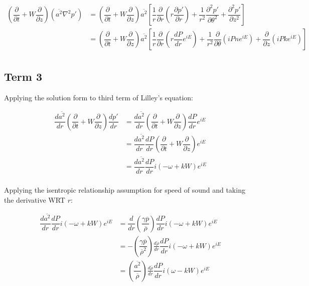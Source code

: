 \documentclass[]{aiaa-tc}%
\begin{document}
\begin{equation}
\begin{split}
\left( \dfrac{\partial}{\partial t} + W \dfrac{\partial}{\partial z} \right) (\overline{a^2}\nabla^2p')
&= \left( \dfrac{\partial}{\partial t} + W \dfrac{\partial}{\partial z}
   \right) \overline{a^2}
   \left[\dfrac{1}{r}\dfrac{\partial}{\partial r} \left( r\dfrac{\partial p'}{\partial r} \right)
      + \dfrac{1}{r^2} \dfrac{\partial^2 p'}{\partial \theta^2}
      + \dfrac{\partial^2 p'}{\partial z^2} \right] \\
&= \left( \dfrac{\partial}{\partial t} + W \dfrac{\partial}{\partial z}
   \right) \overline{a^2}
   \left[\dfrac{1}{r}\dfrac{\partial}{\partial r} \left( r \dfrac{dP}{dr} e^{iE} \right)
      + \dfrac{1}{r^2} \dfrac{\partial }{\partial \theta} \left( iPn e^{iE} \right)
      + \dfrac{\partial}{\partial z} \left( iPk e^{iE} \right) \right] \\
\end{split}
\end{equation}






\clearpage
\subsection{Term 3}

Applying the solution form to third term of Lilley's equation:

\begin{align*}
\dfrac{d \overline{a^2}}{dr} \left( \dfrac{\partial}{\partial t} + W \dfrac{\partial}{\partial z} \right) \dfrac{dp'}{dr}
&= \dfrac{d \overline{a^2}}{dr}
   \left( \dfrac{\partial}{\partial t} + W \dfrac{\partial}{\partial z} \right)
   \dfrac{dP}{dr} e^{iE}  \\
&= \dfrac{d \overline{a^2}}{dr} \dfrac{dP}{dr}
   \left( \dfrac{\partial}{\partial t} + W \dfrac{\partial}{\partial z} \right) e^{iE} \\
&= \dfrac{d \overline{a^2}}{dr} \dfrac{dP}{dr}
    i(-\omega + kW) e^{iE} \\
\end{align*}

Applying the isentropic relationship assumption for speed of sound and taking the derivative WRT $r$:

\begin{align*}
\dfrac{d \overline{a^2}}{dr} \dfrac{dP}{dr}
    i(-\omega + kW) e^{iE}
&= \dfrac{d}{dr} \left(\dfrac{\gamma \overline{p}}{\overline{\rho}}\right)
    \dfrac{dP}{dr} i(-\omega + kW) e^{iE} \\
&= -\left(\dfrac{\gamma \overline{p}}{\overline{\rho}^2}\right) \frac{d \overline{\rho}}{dr}
    \dfrac{dP}{dr} i(-\omega + kW) e^{iE} \\
&= \left(\dfrac{\overline{a^2}}{\overline{\rho}}\right) \frac{d \overline{\rho}}{dr} \dfrac{dP}{dr} i(\omega - kW) e^{iE} \\
\end{align*}
\end{document}
